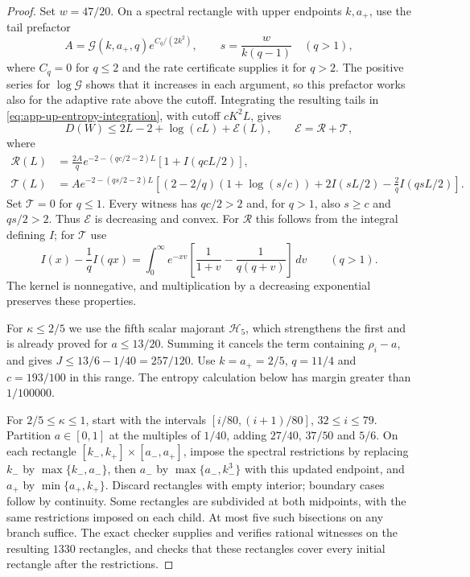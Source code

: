 \documentclass[11pt,a4paper]{article}
\numberwithin{equation}{section}
\begin{document}
\begin{proof}
Set $w=47/20$. On a spectral rectangle with upper endpoints $k,a_+$,
use the tail prefactor
\[
 A=\mathcal G(k,a_+,q)e^{C_q/(2k^2)},\qquad
 s=\frac{w}{k(q-1)}\quad(q>1),
\]
where $C_q=0$ for $q\le2$ and the rate certificate supplies it for $q>2$.
The positive series for $\log\mathcal G$ shows that it increases in each
argument, so this prefactor works also for the adaptive rate above the cutoff.
Integrating the resulting tails in \eqref{eq:app-up-entropy-integration},
with cutoff $cK^2L$, gives
\[
 D(W)\le2L-2+\log(cL)+\mathcal E(L),\qquad \mathcal E=\mathcal R+\mathcal T,
\]
where
\[
\begin{aligned}
 \mathcal R(L)&=\frac{2A}{q}e^{-2-(qc/2-2)L}[1+I(qcL/2)],\\
 \mathcal T(L)&=Ae^{-2-(qs/2-2)L}
 \left[(2-2/q)(1+\log(s/c))+2I(sL/2)-\frac2qI(qsL/2)\right].
\end{aligned}
\]
Set $\mathcal T=0$ for $q\le1$.
Every witness has $qc/2>2$ and, for $q>1$, also $s\ge c$ and $qs/2>2$.
Thus $\mathcal E$ is decreasing and convex. For $\mathcal R$ this follows
from the integral defining $I$; for $\mathcal T$ use
\[
 I(x)-\frac1qI(qx)=\int_0^\infty e^{-xv}
 \left[\frac1{1+v}-\frac1{q(q+v)}\right]\,dv\qquad(q>1).
\]
The kernel is nonnegative, and multiplication by a decreasing exponential
preserves these properties.

For $\kappa\le2/5$ we use the fifth scalar majorant
$\mathcal H_5$, which strengthens the first and is already proved for $a\le13/20$.
Summing it cancels the term containing $\rho_i-a$, and gives
$J\le13/6-1/40=257/120$.
Use $k=a_+=2/5$, $q=11/4$ and $c=193/100$ in this range.
The entropy calculation below has margin greater than $1/100000$.

For $2/5\le\kappa\le1$, start with the intervals
$[i/80,(i+1)/80]$, $32\le i\le79$.
Partition $a\in[0,1]$ at the multiples of $1/40$, adding
$27/40$, $37/50$ and $5/6$.
On each rectangle $[k_-,k_+]\times[a_-,a_+]$, impose the spectral
restrictions by replacing $k_-$ by $\max\{k_-,a_-\}$,
then $a_-$ by $\max\{a_-,k_-^3\}$ with this updated endpoint,
and $a_+$ by $\min\{a_+,k_+\}$.
Discard rectangles with empty interior; boundary cases follow by continuity.
Some rectangles are subdivided at both midpoints, with the same
restrictions imposed on each child. At most five such bisections on any
branch suffice.
The exact checker supplies and verifies rational witnesses on the resulting
$1330$ rectangles, and checks that these rectangles cover every initial
rectangle after the restrictions.


\end{proof}
\end{document}
